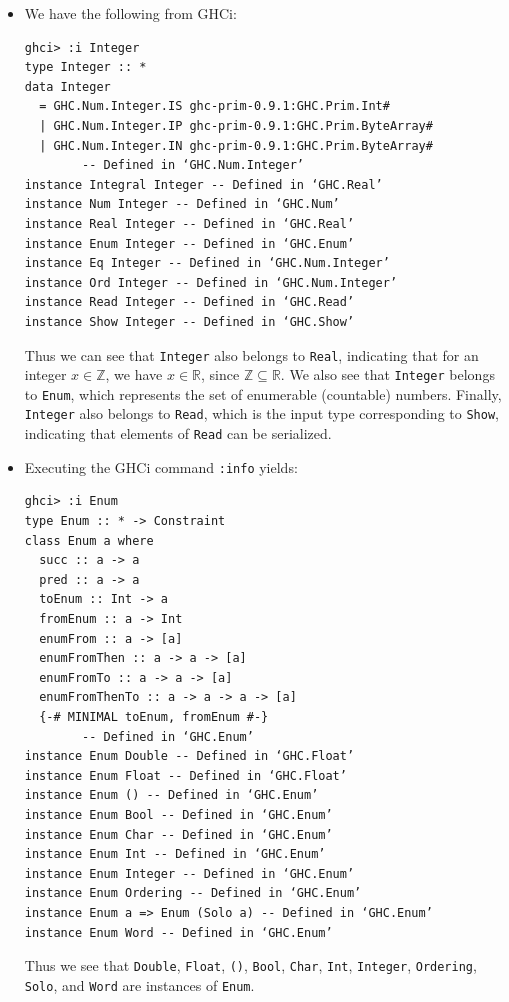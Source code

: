 \begin{itemize}
    \item[(a)] We have the following from GHCi:
        \begin{lstlisting}
ghci> :i Integer
type Integer :: *
data Integer
  = GHC.Num.Integer.IS ghc-prim-0.9.1:GHC.Prim.Int#
  | GHC.Num.Integer.IP ghc-prim-0.9.1:GHC.Prim.ByteArray#
  | GHC.Num.Integer.IN ghc-prim-0.9.1:GHC.Prim.ByteArray#
        -- Defined in ‘GHC.Num.Integer’
instance Integral Integer -- Defined in ‘GHC.Real’
instance Num Integer -- Defined in ‘GHC.Num’
instance Real Integer -- Defined in ‘GHC.Real’
instance Enum Integer -- Defined in ‘GHC.Enum’
instance Eq Integer -- Defined in ‘GHC.Num.Integer’
instance Ord Integer -- Defined in ‘GHC.Num.Integer’
instance Read Integer -- Defined in ‘GHC.Read’
instance Show Integer -- Defined in ‘GHC.Show’
        \end{lstlisting}
        Thus we can see that \verb|Integer| also belongs to \verb|Real|,
        indicating that for an integer $x \in \mathbb{Z}$, we have $x \in \mathbb{R}$, 
        since $\mathbb{Z} \subseteq \mathbb{R}$. We also see that \verb|Integer|
        belongs to \verb|Enum|, which represents the set of enumerable (countable) 
        numbers. Finally, \verb|Integer| also belongs to \verb|Read|, which is the
        input type corresponding to \verb|Show|, indicating that elements of 
        \verb|Read| can be serialized.
    \item[(b)] Executing the GHCi command \verb|:info| yields:
        \begin{lstlisting}
ghci> :i Enum
type Enum :: * -> Constraint
class Enum a where
  succ :: a -> a
  pred :: a -> a
  toEnum :: Int -> a
  fromEnum :: a -> Int
  enumFrom :: a -> [a]
  enumFromThen :: a -> a -> [a]
  enumFromTo :: a -> a -> [a]
  enumFromThenTo :: a -> a -> a -> [a]
  {-# MINIMAL toEnum, fromEnum #-}
        -- Defined in ‘GHC.Enum’
instance Enum Double -- Defined in ‘GHC.Float’
instance Enum Float -- Defined in ‘GHC.Float’
instance Enum () -- Defined in ‘GHC.Enum’
instance Enum Bool -- Defined in ‘GHC.Enum’
instance Enum Char -- Defined in ‘GHC.Enum’
instance Enum Int -- Defined in ‘GHC.Enum’
instance Enum Integer -- Defined in ‘GHC.Enum’
instance Enum Ordering -- Defined in ‘GHC.Enum’
instance Enum a => Enum (Solo a) -- Defined in ‘GHC.Enum’
instance Enum Word -- Defined in ‘GHC.Enum’
        \end{lstlisting}
        Thus we see that \verb|Double|, \verb|Float|, \verb|()|, \verb|Bool|, 
        \verb|Char|, \verb|Int|, \verb|Integer|, \verb|Ordering|, \verb|Solo|,
        and \verb|Word| are instances of \verb|Enum|.
\end{itemize}
